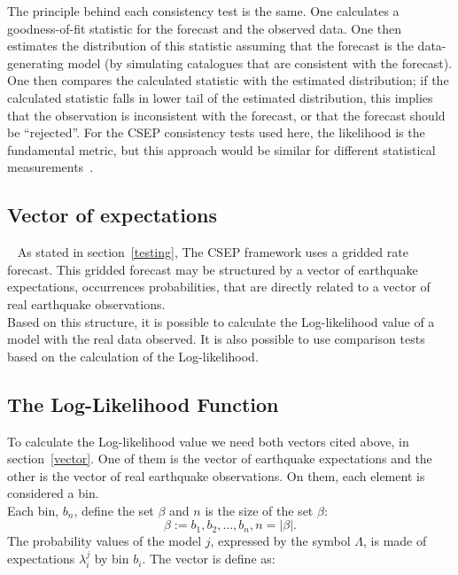 The principle behind each consistency test is the same. One calculates a goodness-of-fit statistic for the forecast and the observed data. One then estimates the distribution of
this statistic assuming that the forecast is the data-generating model (by simulating catalogues that are consistent with the forecast). One then compares the calculated statistic with the estimated distribution; if the calculated statistic falls in lower tail of the estimated distribution, this implies that the observation is inconsistent with the forecast, or that the forecast should be “rejected”. For the CSEP consistency tests used here, the likelihood is the fundamental metric, but this approach would be similar for different statistical measurements~\cite{eberhard2014multiscale}.\\

\subsection{Vector of expectations}~\label{vector}
As stated in section~\ref{testing}, The CSEP framework uses a gridded rate forecast. This gridded forecast may be structured by a vector of earthquake expectations, occurrences probabilities, that are directly related to a vector of real earthquake observations.\\

Based on this structure, it is possible to calculate the Log-likelihood value of a model with the real data observed. It is also possible to use comparison tests based on the calculation of the Log-likelihood.\\

\subsection{The Log-Likelihood Function}\label{log-fuction}
To calculate the Log-likelihood value we need both vectors cited above, in section~\ref{vector}. One of them is the vector of earthquake expectations and the other is the vector of real earthquake observations. On them, each element is considered a bin. \\

Each bin, $b_n$, define the set $\beta$ and $n$ is the size of the set $\beta$:
\begin{equation} 
\beta := {b_1,b_2,...,b_n},n = |\beta|.
\end{equation}
The probability values of the model $j$, expressed by the symbol
$\Lambda$, is made of expectations $\lambda_i^j$ by bin $b_i$. The
vector is define as:
				
